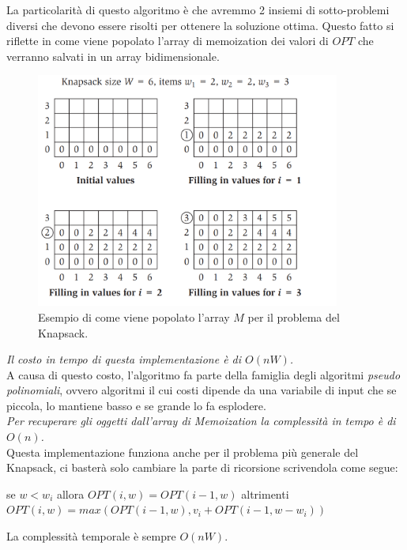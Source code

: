 La particolarità di questo algoritmo è che avremmo 2 insiemi di sotto-problemi
diversi che devono essere risolti per ottenere la soluzione ottima. Questo fatto
si riflette in come viene popolato l'array di memoization dei valori di $OPT$
che verranno salvati in un array bidimensionale.

\begin{figure}[H]
    \centering
    \includegraphics[width=10cm, keepaspectratio]{capitoli/imgs/knapsac_table.png}
    \caption{Esempio di come viene popolato l'array $M$ per il problema del Knapsack.}
\end{figure}

\textit{Il costo in tempo di questa implementazione è di $O(nW)$.}\\

A causa di questo costo, l'algoritmo fa parte della famiglia degli
algoritmi \textit{pseudo polinomiali}, ovvero algoritmi il cui costi dipende da
una variabile di input che se piccola, lo mantiene basso e se grande lo fa
esplodere.\\

\textit{Per recuperare gli oggetti dall'array di Memoization la complessità in tempo è di
    $O(n)$.}\\

Questa implementazione funziona anche per il problema più generale del Knapsack,
ci basterà solo cambiare la parte di ricorsione scrivendola come segue:

\begin{center}
    se $w < w_i$ allora $OPT(i, w) = OPT(i-1,w)$ altrimenti
    $OPT(i, w) = max(OPT(i-1, w), v_i + OPT(i-1, w-w_i))$
\end{center}

La complessità temporale è sempre $O(nW)$.